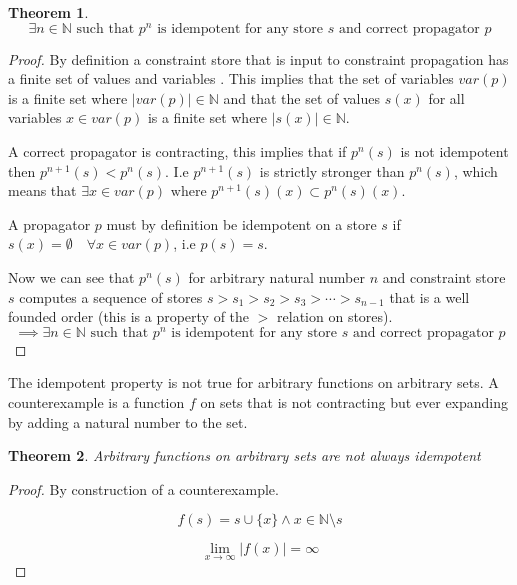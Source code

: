 \documentclass[a4paper, 11pt]{article}
\newtheorem{theorem}{Theorem}[section]
\begin{document}
\begin{theorem}
  $$\exists n \in \mathbb{N} \text{ such that } p^n \text{ is idempotent for any store } s \text{ and correct propagator }p$$
\end{theorem}
\begin{proof}
By definition a constraint store that is input to constraint propagation has a finite set of values and variables \citep{schulte_notes}. This implies that the set of variables $var(p)$ is a finite set where $|var(p)| \in \mathbb{N}$ and that the set of values $s(x)$ for all variables $x \in var(p)$ is a finite set where $|s(x)| \in \mathbb{N}$.

A correct propagator is contracting, this implies that if $p^n(s)$ is not idempotent then $p^{n+1}(s) < p^n(s)$. I.e $p^{n+1}(s)$ is strictly stronger than $p^n(s)$, which means that $\exists x \in var(p) \text{ where } p^{n+1}(s)(x) \subset p^{n}(s)(x)$.

A propagator $p$ must by definition be idempotent on a store $s$ if $s(x) = \emptyset \quad \forall x \in var(p)$, i.e $p(s) = s$.

Now we can see that $p^n(s)$ for arbitrary natural number $n$ and constraint store $s$ computes a sequence of stores $s > s_1 > s_2 > s_3 > \cdots > s_{n-1}$ that is a well founded order (this is a property of the $>$ relation on stores\citep{schulte_notes}).
  $$\implies \exists n \in \mathbb{N} \text{ such that } p^n \text{ is idempotent for any store } s \text{ and correct propagator }p$$
\end{proof}

The idempotent property is not true for arbitrary functions on arbitrary sets. A counterexample is a function $f$ on sets that is not contracting but ever expanding by adding a natural number to the set.
\begin{theorem}
Arbitrary functions on arbitrary sets are not always idempotent
\end{theorem}
\begin{proof}
By construction of a counterexample.
  
$$f(s) = s \cup \{x\} \land x \in \mathbb{N} \setminus s$$

$$\lim_{x\to\infty} |f(x)| = \infty$$
\end{proof}

{}

\end{document}
